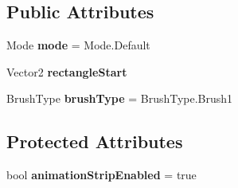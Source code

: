 \subsection*{Public Attributes}
\begin{DoxyCompactItemize}
\item 
\hypertarget{class_rage_pixel_sprite_editor_aa22fd81df35bcf7e4a2b2fe06d21bc64}{Mode {\bfseries mode} = Mode.\-Default}\label{class_rage_pixel_sprite_editor_aa22fd81df35bcf7e4a2b2fe06d21bc64}

\item 
\hypertarget{class_rage_pixel_sprite_editor_ad35b0f96df30dfcf4e0e15ca920485b4}{Vector2 {\bfseries rectangle\-Start}}\label{class_rage_pixel_sprite_editor_ad35b0f96df30dfcf4e0e15ca920485b4}

\item 
\hypertarget{class_rage_pixel_sprite_editor_a985891f307eeeaf65c9941d33908b26a}{Brush\-Type {\bfseries brush\-Type} = Brush\-Type.\-Brush1}\label{class_rage_pixel_sprite_editor_a985891f307eeeaf65c9941d33908b26a}

\end{DoxyCompactItemize}
\subsection*{Protected Attributes}
\begin{DoxyCompactItemize}
\item 
\hypertarget{class_rage_pixel_sprite_editor_adc9ca5b140961362a8d950ff4016a65f}{bool {\bfseries animation\-Strip\-Enabled} = true}\label{class_rage_pixel_sprite_editor_adc9ca5b140961362a8d950ff4016a65f}

\end{DoxyCompactItemize}
